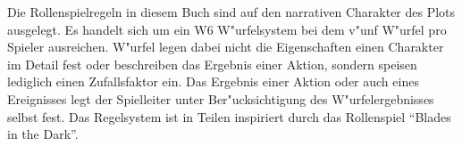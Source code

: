 
Die Rollenspielregeln in diesem Buch sind auf den narrativen Charakter des Plots ausgelegt. Es handelt sich um ein W6 W"urfelsystem bei dem v"unf W"urfel pro Spieler ausreichen. W"urfel legen dabei nicht die Eigenschaften einen Charakter im Detail fest oder beschreiben das Ergebnis einer Aktion, sondern speisen lediglich einen Zufallsfaktor ein. Das Ergebnis einer Aktion oder auch eines Ereignisses legt der Spielleiter unter Ber"ucksichtigung des W"urfelergebnisses selbst fest. Das Regelsystem ist in Teilen inspiriert durch das Rollenspiel ``Blades in the Dark''.











